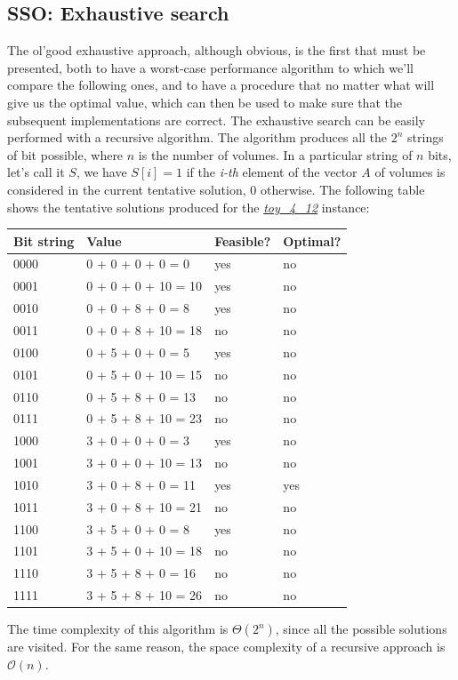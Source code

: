 \documentclass[12pt]{extarticle}
\begin{document}
\subsection{SSO: Exhaustive search}
\label{SSO-exhaustive-search}
The ol'good exhaustive approach, although obvious, is the first that must be presented, both to have a worst-case performance algorithm to which we'll compare the following ones, and to have a procedure that no matter what will give us the optimal value, which can then be used to make sure that the subsequent implementations are correct.\newline
The exhaustive search can be easily performed with a recursive algorithm. 
The algorithm produces all the $2^{n}$ strings of bit possible, where $n$ is the number of volumes. In a particular string of $n$ bits, let's call it $S$, we have $S[i] = 1$ if the \emph{i-th} element of the vector $A$ of volumes is considered in the current tentative solution, $0$ otherwise. The following table shows the tentative solutions produced for the \hyperref[marker-toy-4-12]{\emph{toy\_4\_12}} instance:
\begin{center}
\begin{tabular}{ | m{2cm} | m{5cm}| m{2cm} | m{2cm} |}
 \hline
 Bit string & Value & Feasible? & Optimal?\\
 \hline
 0000 & 0 + 0 + 0 + 0 = 0 & yes & no\\
 \hline
 0001 & 0 + 0 + 0 + 10 = 10 & yes & no\\
 \hline
 0010 & 0 + 0 + 8 + 0 = 8 & yes & no\\
 \hline
 0011 & 0 + 0 + 8 + 10 = 18 & no & no\\
 \hline
 0100 & 0 + 5 + 0 + 0 = 5 & yes & no\\
 \hline
 0101 & 0 + 5 + 0 + 10 = 15 & no & no\\
 \hline
 0110 & 0 + 5 + 8 + 0 = 13 & no & no\\
 \hline
 0111 & 0 + 5 + 8 + 10 = 23 & no & no\\
 \hline
 1000 & 3 + 0 + 0 + 0 = 3 & yes & no\\
 \hline
 1001 & 3 + 0 + 0 + 10 = 13 & no & no\\
 \hline
 1010 & 3 + 0 + 8 + 0 = 11 & yes & yes\\
 \hline
 1011 & 3 + 0 + 8 + 10 = 21 & no & no\\
 \hline
 1100 & 3 + 5 + 0 + 0 = 8 & yes & no\\
 \hline
 1101 & 3 + 5 + 0 + 10 = 18 & no & no\\
 \hline
 1110 & 3 + 5 + 8 + 0 = 16 & no & no\\
 \hline
 1111 & 3 + 5 + 8 + 10 = 26 & no & no\\
 \hline
\end{tabular}
\end{center}
The time complexity of this algorithm is $\Theta(2^{n})$, since all the possible solutions are visited. For the same reason, the space complexity of a recursive approach is $\mathcal{O}(n)$.
\end{document}
